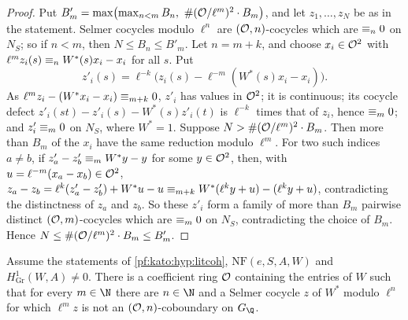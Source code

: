 \begin{proof}
Put $B'_m=\max\bigl(\max_{n<m}B_n,\ \#(\katoO/\ell^m)^2\cdot B_m\bigr)$, and let $z_1,\dots,z_N$ be as in the statement. Selmer cocycles modulo
$\ell^n$ are $(\mathcal{O},n)$-cocycles which are $\equiv_{n}0$ on $N_S$; so if $n<m$, then $N\le B_n\le B'_m$. Let $n=m+k$, and choose $x_i\in\mathcal{O}^2$
with $\ell^mz_i(s)\equiv_{n}W^*(s)x_i-x_i$ for all $s$. Put
\[
  z'_i(s)=\ell^{-k}\bigl(z_i(s)-\ell^{-m}(W^*(s)x_i-x_i)\bigr).
\]
As $\ell^mz_i-(W^*x_i-x_i)\equiv_{m+k}0$, $z'_i$ has values in $\mathcal{O}^2$; it is continuous; its cocycle defect
$z'_i(st)-z'_i(s)-W^*(s)z'_i(t)$ is $\ell^{-k}$ times that of $z_i$, hence $\equiv_{m}0$; and $z'_i\equiv_{m}0$ on $N_S$, where $W^*=1$. Suppose
$N>\#(\mathcal{O}/\ell^m)^2\cdot B_m$. Then more than $B_m$ of the $x_i$ have the same reduction modulo $\ell^m$. For two such indices $a\ne b$, if
$z'_a-z'_b\equiv_{m}W^*y-y$ for some $y\in\mathcal{O}^2$, then, with $u=\ell^{-m}(x_a-x_b)\in\mathcal{O}^2$,
$z_a-z_b=\ell^k(z'_a-z'_b)+W^*u-u\equiv_{m+k}W^*(\ell^ky+u)-(\ell^ky+u)$, contradicting the distinctness of $z_a$ and $z_b$. So these $z'_i$
form a family of more than $B_m$ pairwise distinct $(\mathcal{O},m)$-cocycles which are $\equiv_{m}0$ on $N_S$, contradicting the choice of $B_m$.
Hence $N\le\#(\mathcal{O}/\ell^m)^2\cdot B_m\le B'_m$.
\end{proof}

\begin{theorem}\label{pf:kato:gwstep1}
Assume the statements of \cref{pf:kato:hyp:litcoh}, $\mathrm{NF}(e,S,A,W)$ and $H^1_{\mathrm{Gr}}(W,A)\ne0$. There is a coefficient ring
$\mathcal{O}$ containing the entries of $W$ such that for every $m\in\N$ there are $n\in\N$ and a Selmer cocycle $z$ of $W^*$ modulo $\ell^n$ for
which $\ell^mz$ is not an $(\mathcal{O},n)$-coboundary on $G_\Q$.
\end{theorem}

